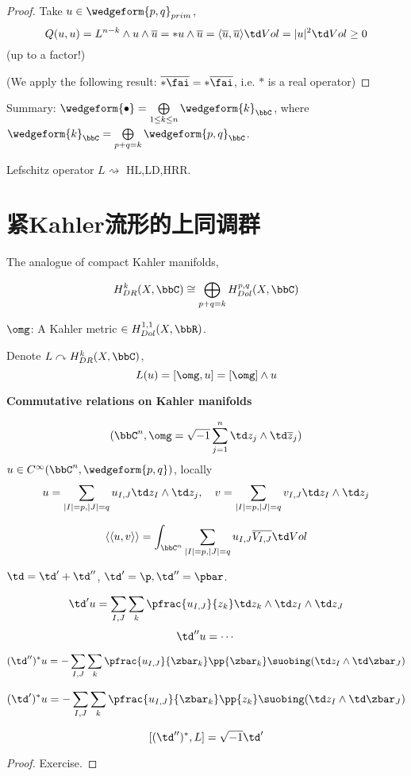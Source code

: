 \begin{proof}
Take $u\in\wedgeform{p,q}_{prim}$,
$$Q(u,u)=L^{n-k}\wedge u\wedge\overline{u}
=*u\wedge\overline{u}=\langle\overline{u},\overline{u}\rangle\td Vol
=|u|^2\td Vol\geq 0$$
(up to a factor!)

(We apply the following result: $\overline{*\fai}=*\overline{\fai}$,
i.e. $*$ is a real operator)
\end{proof}

Summary: $\wedgeform{\bullet}=\bigoplus\limits_{1\leq k\leq n}\wedgeform{k}_\bbC$,
where$\wedgeform{k}_{\bbC}=\bigoplus\limits_{p+q=k}\wedgeform{p,q}_\bbC$.

Lefschitz operator $L\rightsquigarrow$ HL,LD,HRR.


\section{紧Kahler流形的上同调群}

The analogue of compact Kahler manifolds,

$$H^k_{DR}(X,\bbC)\cong\bigoplus_{p+q=k}H^{p,q}_{Dol}(X,\bbC)$$

$\omg$: A Kahler metric $\in H^{1,1}_{Dol}(X,\bbR)$.

Denote $L\curvearrowright H^k_{DR}(X,\bbC)$,
$$L(u)=[\omg,u]=[\omg]\wedge u$$

\textbf{Commutative relations on Kahler manifolds}

$$(\bbC^n,\omg=\sqrt{-1}\sum_{j=1}^n\td z_j\wedge\td\overline{z}_j)$$
$u\in C^\infty(\bbC^n,\wedgeform{p,q})$, locally
$$u=\sum_{|I|=p,|J|=q}u_{I,J}\td z_I\wedge \td z_j,\quad
v=\sum_{|I|=p,|J|=q}v_{I,J}\td z_I\wedge \td z_j
$$

$$\langle\langle u,v\rangle\rangle=
\int_{\bbC^n}\sum_{|I|=p,|J|=q}
u_{I,J}\overline{V_{I,J}}\td Vol$$

$\td=\td'+\td''$, $\td'=\p,\td''=\pbar$.

$$\td' u=\sum_{I,J}\sum_k\pfrac{u_{I,J}}{z_k}\td z_k\wedge\td z_I\wedge\td z_J$$
$$\td''u=\cdots$$

\begin{thm}
$$
  (\td'')^*u
=
  -\sum_{I,J}
    \sum_k
    \pfrac{u_{I,J}}{\zbar_k}
    \pp{\zbar_k}
    \suobing
    (\td z_I\wedge\td\zbar_J)
$$

$$
  (\td')^*u
=
  -\sum_{I,J}
    \sum_k
      \pfrac{u_{I,J}}{\zbar_k}
      \pp{z_k}
      \suobing
      (\td z_I\wedge\td\zbar_J)
$$
\end{thm}

\begin{prop}
$$[(\td'')^*,L]=\sqrt{-1}\td'$$
\end{prop}
\begin{proof}
Exercise.
\end{proof}

